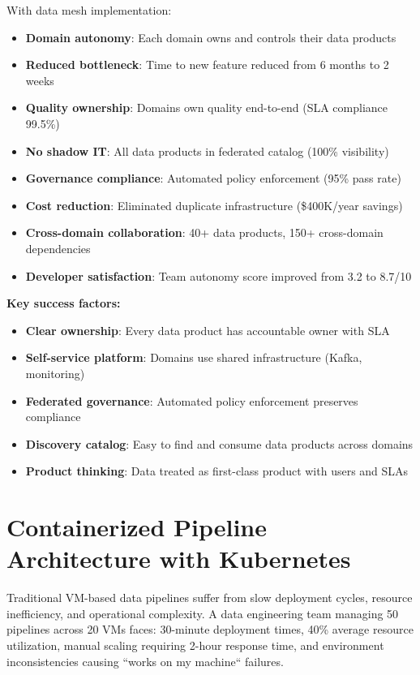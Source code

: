 With data mesh implementation:

\begin{itemize}
    \item \textbf{Domain autonomy}: Each domain owns and controls their data products
    \item \textbf{Reduced bottleneck}: Time to new feature reduced from 6 months to 2 weeks
    \item \textbf{Quality ownership}: Domains own quality end-to-end (SLA compliance 99.5\%)
    \item \textbf{No shadow IT}: All data products in federated catalog (100\% visibility)
    \item \textbf{Governance compliance}: Automated policy enforcement (95\% pass rate)
    \item \textbf{Cost reduction}: Eliminated duplicate infrastructure (\$400K/year savings)
    \item \textbf{Cross-domain collaboration}: 40+ data products, 150+ cross-domain dependencies
    \item \textbf{Developer satisfaction}: Team autonomy score improved from 3.2 to 8.7/10
\end{itemize}

\textbf{Key success factors:}
\begin{itemize}
    \item \textbf{Clear ownership}: Every data product has accountable owner with SLA
    \item \textbf{Self-service platform}: Domains use shared infrastructure (Kafka, monitoring)
    \item \textbf{Federated governance}: Automated policy enforcement preserves compliance
    \item \textbf{Discovery catalog}: Easy to find and consume data products across domains
    \item \textbf{Product thinking}: Data treated as first-class product with users and SLAs
\end{itemize}

\section{Containerized Pipeline Architecture with Kubernetes}

Traditional VM-based data pipelines suffer from slow deployment cycles, resource inefficiency, and operational complexity. A data engineering team managing 50 pipelines across 20 VMs faces: 30-minute deployment times, 40\% average resource utilization, manual scaling requiring 2-hour response time, and environment inconsistencies causing ``works on my machine`` failures.

